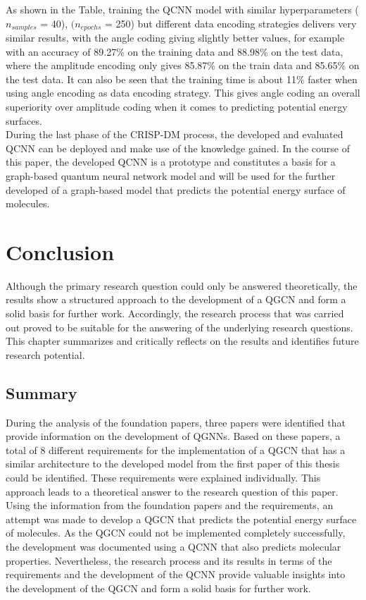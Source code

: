 As shown in the Table, training the QCNN model with similar hyperparameters ($n_{samples}$ = 40), $(n_{epochs}$ = 250) but different data encoding strategies delivers very similar results, with the angle coding giving slightly better values, for example with an accuracy of 89.27\% on the training data and 88.98\% on the test data, where the amplitude encoding only gives 85.87\% on the train data and 85.65\% on the test data. It can also be seen that the training time is about 11\% faster when using angle encoding as data encoding strategy. This gives angle coding an overall superiority over amplitude coding when it comes to predicting potential energy surfaces.\\

During the last phase of the CRISP-DM process, the developed and evaluated QCNN can be deployed and make use of the knowledge gained. In the course of this paper, the developed QCNN is a prototype and constitutes a basis for a graph-based quantum neural network model and will be used for the further developed of a graph-based model that predicts the potential energy surface of molecules. 

\section{Conclusion}
Although the primary research question could only be answered theoretically, the results show a structured approach to the development of a QGCN and form a solid basis for further work. Accordingly, the research process that was carried out proved to be suitable for the answering of the underlying research questions. This chapter summarizes and critically reflects on the results and identifies future research potential.

\subsection{Summary}
During the analysis of the foundation papers, three papers were identified that provide information on the development of QGNNs. Based on these papers, a total of 8 different requirements for the implementation of a QGCN that has a similar architecture to the developed model from the first paper of this thesis could be identified. These requirements were explained individually. This approach leads to a theoretical answer to the research question of this paper. Using the information from the foundation papers and the requirements, an attempt was made to develop a QGCN that predicts the potential energy surface of molecules. As the QGCN could not be implemented completely successfully, the development was documented using a QCNN that also predicts molecular properties. Nevertheless, the research process and its results in terms of the requirements and the development of the QCNN provide valuable insights into the development of the QGCN and form a solid basis for further work. 


